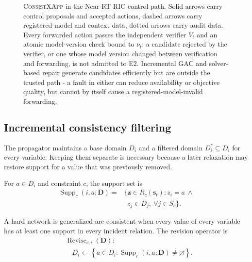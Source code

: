 \documentclass[pdflatex,sn-mathphys-num,iicol,oneside]{sn-jnl}
\newcommand{\method}{\textsc{ConsistXApp}\xspace}
\newcommand{\gac}{\textsc{GAC}\xspace}
\begin{document}
\begin{figure}[t]
{
}
\caption{
\method in the Near-RT RIC control path. Solid arrows carry control
proposals and accepted actions, dashed arrows carry registered-model
and context data, dotted arrows carry audit data. Every forwarded
action passes the independent verifier $V_t$ and an atomic
model-version check bound to $\nu_t$: a candidate rejected by the
verifier, or one whose model version changed between verification and
forwarding, is not admitted to E2. Incremental \gac and solver-based
repair generate candidates efficiently but are outside the trusted
path - a fault in either can reduce availability or objective
quality, but cannot by itself cause a registered-model-invalid
forwarding.
}
\label{fig:architecture}
\end{figure}

\subsection{Incremental consistency filtering}
\label{sec:gac}

The propagator maintains a base domain $D_i$ and a filtered domain
$D_i^{*}\subseteq D_i$ for every variable. Keeping them separate is
necessary because a later relaxation may restore support for a value
that was previously removed.

For $a\in D_i$ and constraint $c$, the support set is
\begin{equation}
\begin{split}
\operatorname{Supp}_{c}
(i,a;\bm{D})
={}&
\bigl\{
\bm{z}\in R_c(\bm{s}_t):
z_i=a
\ \land\\
&\ \
z_j\in D_j,\
\forall j\in S_c
\bigr\}.
\end{split}
\label{eq:support}
\end{equation}

A hard network is generalized arc consistent when every value of
every variable has at least one support in every incident relation.
The revision operator is
\begin{equation}
\begin{split}
&\operatorname{Revise}_{c,i}(\bm{D}):
\\
&\quad
D_i
\leftarrow
\left\{
a\in D_i:
\operatorname{Supp}_{c}(i,a;\bm{D})
\neq\varnothing
\right\}.
\end{split}
\label{eq:revise}
\end{equation}
\end{document}
